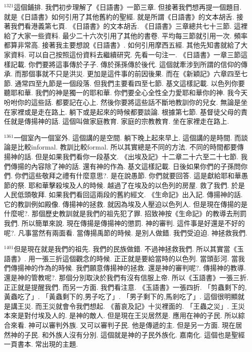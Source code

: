 \documentclass{book}
\begin{document}
$^{1321}$這個鋪排.
我們初步理解了《日語書》一節三章.
但接著我們想再提一個題目.
就是《日語書》如何引用了其他舊約的聖經.
就是所謂《日語書》的文本胡舌.
接著我們看港義第七頁.
《日語書》的文本胡舌.
《日語書》三章總共七十三節.
這裡給了大家一些資料.
最少二十六次引用了其他的書卷.
平均每三節就引用一次.
頻率都算非常高.
接著我主要想說《日語書》.
如何引用摩西五經.
其他先知書就給了大家資料.
可以自己按照這份資料去繼續研究.
先看一句注一.
《日語書》一章三節這樣記載.
你們要將這事傳於子子.
傳於孫孫傳於後代.
這個就牽涉到所謂的信仰的傳承.
而那個事就不只是洪災.
更加是這件事的前因後果.
而在《新穎記》六章四至七節.
通常四至九節是一個段落.
但我們主要看四至七節.
基文這樣記載.
以色列你要聽耶和華.
我們的神是獨一的耶和華.
你們要全心全性全力愛耶和華你的神.
我今天吩咐你的這些話.
都要記在心上.
然後你要將這些話不斷地教訓你的兒女.
無論是坐在家裡或是走在路上.
躺下或是起來的時候都要談論.
根據第七節.
基督徒父母的責任就是傳揚神的話.
這個叫做家庭教育.
家庭的宗教教育.
坐在家裡走在路上.

$^{1361}$一個室內一個室外.
這個講的是空間.
躺下晚上起來早上.
這個講的是時間.
而談論是比較informal.
教訓比較formal.
所以其實總是不同的方法.
不同的時間都要傳揚神的話.
但是如果我們看你一段基文.
《出埃及記》十二章二十六至二十七節.
我們傳揚的內容除了神的話.
還有神的作為.
基文這樣記載.
日後如果你們的子孫問你們.
你們這些敬拜之禮有什麼意思?.
是在說愚節.
你們就要回答.
這是獻給耶和華愚節的祭.
耶和華擊殺埃及人的時候.
越過了在埃及的以色列的房屋.
救了我們.
於是人民低頭敬拜.
如果我們看回這兩段的舊約經文.
《生命記》出入記.
傳揚神的話.
它的教訓例如殿像.
傳揚神的拯救.
就因為埃及人壓迫以色列人.
但是現在傳揚的是什麼呢?.
那個歷史教訓就是我們的祖先犯了罪.
招致神按《生命記》的教導去刑罰我們.
所以簡單來說.
現在傳揚是傳揚神的懲罰.
神的審判.
這件事是好還是不好的呢?.
凡事當然有兩面看.
當傳揚禹節的時候.
是別人做錯.
我們受迫迫.
神拯救我們.

$^{1401}$但是現在就是我們的祖先.
我們的民族做錯.
不過神拯救我們.
所以其實當《玉語書》.
用一張三折這個觀念的時候.
正正就是要給當時的以色列.
當頭彭河.
當我們傳揚神的作為的時候.
我們願意傳揚神的拯救.
還是神的審判呢?.
傳揚神的教導.
還是神的管教呢?.
那個分別取決於我們有沒有信服上帝.
所以《玉語書》一張三折.
正正就是提醒我們.
而另一方面.
我們看注意.
《玉語書》一張四折.
「剪蟲剩下的,黃蟲吃了」.
「黃蟲剩下的,男子吃了」.
「男子剩下的,馬剎吃了」.
這個很明顯就是講王災.
而王災就會令我們想起.
《蓄哀及記》十災裡面的.
「王蟲之災」.
王災本來是對付埃及人的.
是神的敵人.
但是現在王災居然是.
應用在神的子民.
所以綜合來看.
神可以審判外族.
又可以審判子民.
他是傳遞的主.
但是另一方面.
現在居然神的子民.
和外族人沒有分別.
這個就是神的子民外族化.
嘉南化.
這個也是聖經一頁書本.
常出現的主題.
\end{document}
